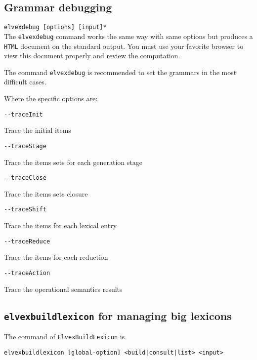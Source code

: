 \documentclass[11pt]{article}
\begin{document}
\subsection{Grammar debugging}

\noindent
\verb#elvexdebug [options] [input]*#\\

The \texttt{elvexdebug} command works the same way with same options
but produces a \texttt{HTML} document on the standard output. You must
use your favorite browser to view this document properly and review
the computation.

The command \texttt{elvexdebug} is recommended to set the grammars in
the most difficult cases.

Where the specific options are:

\begin{description}

\item \verb#--traceInit#

  Trace the initial items
  
\item \verb#--traceStage#

  Trace the items sets for each generation stage
  
\item \verb#--traceClose#

  Trace the items sets closure
  
\item \verb#--traceShift#

  Trace the items for each lexical entry
  
\item \verb#--traceReduce#

  Trace the items for each reduction

\item \verb#--traceAction#

  Trace the operational semantics results
  
\end{description}

\subsection{\texttt{elvexbuildlexicon} for managing big lexicons}

The command of \texttt{ElvexBuildLexicon} is

\noindent
\verb#elvexbuildlexicon [global-option] <build|consult|list> <input>#\\
\end{document}
